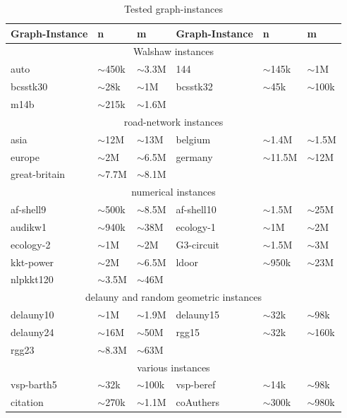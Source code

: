 \documentclass[acmsmall,nonacm,screen,review]{acmart}
\begin{document}
\begin{table}[ht]
  \begin{tabular}{ |p{3cm}|p{1.5cm}|p{1.5cm}|p{3cm}|p{1.5cm}|p{1.5cm}|  }
    \hline
    Graph-Instance & n & m & Graph-Instance & n & m\\
    \hline
    \hline
    \multicolumn{6}{|c|}{Walshaw instances} \\
    \hline
    auto & $\sim$450k & $\sim$3.3M & 144 & $\sim$145k & $\sim$1M\\
    bcsstk30 & $\sim$28k & $\sim$1M & bcsstk32 & $\sim$45k & $\sim$100k\\
    m14b & $\sim$215k & $\sim$1.6M &  &  & \\
    \hline
    \multicolumn{6}{|c|}{road-network instances} \\
    \hline
    asia & $\sim$12M & $\sim$13M & belgium & $\sim$1.4M & $\sim$1.5M\\
    europe & $\sim$2M & $\sim$6.5M & germany & $\sim$11.5M & $\sim$12M\\
    great-britain & $\sim$7.7M & $\sim$8.1M &  &  & \\
    \hline
    \multicolumn{6}{|c|}{numerical instances} \\
    \hline
    af-shell9 & $\sim$500k & $\sim$8.5M & af-shell10 & $\sim$1.5M & $\sim$25M\\
    audikw1 & $\sim$940k & $\sim$38M & ecology-1 & $\sim$1M & $\sim$2M\\
    ecology-2 & $\sim$1M & $\sim$2M & G3-circuit & $\sim$1.5M & $\sim$3M\\
    kkt-power & $\sim$2M & $\sim$6.5M & ldoor & $\sim$950k & $\sim$23M\\
    nlpkkt120 & $\sim$3.5M & $\sim$46M &  &  & \\
    \hline
    \multicolumn{6}{|c|}{delauny and random geometric instances} \\
    \hline
    delauny10 & $\sim$1M & $\sim$1.9M & delauny15 & $\sim$32k & $\sim$98k\\
    delauny24 & $\sim$16M & $\sim$50M & rgg15 & $\sim$32k & $\sim$160k\\
    rgg23 & $\sim$8.3M & $\sim$63M &  &  & \\
    \hline
    \multicolumn{6}{|c|}{various instances} \\
    \hline
    vsp-barth5 & $\sim$32k & $\sim$100k & vsp-beref & $\sim$14k & $\sim$98k\\
    citation & $\sim$270k & $\sim$1.1M & coAuthers &  $\sim$300k & $\sim$980k\\
    \hline
  \end{tabular}
  \caption{Tested graph-instances}
  \label{tab:instances}
\end{table}
\newpage
\end{document}
